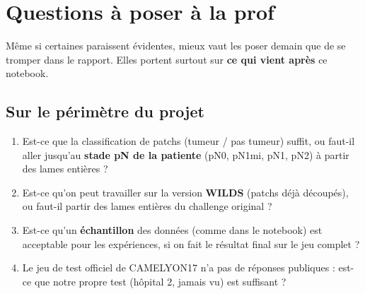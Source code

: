 \documentclass[11pt,a4paper]{article}
\begin{document}
\section{Questions à poser à la prof}
\label{sec:questions}
\noindent Même si certaines paraissent évidentes, mieux vaut les poser demain que de se tromper dans le
rapport. Elles portent surtout sur \textbf{ce qui vient après} ce notebook.

\subsection*{Sur le périmètre du projet}
\begin{enumerate}[label=\textbf{Q\arabic*.}]
  \item Est-ce que la classification de patchs (tumeur / pas tumeur) suffit, ou faut-il aller jusqu'au
        \textbf{stade pN de la patiente} (pN0, pN1mi, pN1, pN2) à partir des lames entières ?
  \item Est-ce qu'on peut travailler sur la version \textbf{WILDS} (patchs déjà découpés), ou faut-il partir
        des lames entières du challenge original ?
  \item Est-ce qu'un \textbf{échantillon} des données (comme dans le notebook) est acceptable pour les
        expériences, si on fait le résultat final sur le jeu complet ?
  \item Le jeu de test officiel de CAMELYON17 n'a pas de réponses publiques : est-ce que notre propre test
        (hôpital 2, jamais vu) est suffisant ?
\end{enumerate}
\end{document}
